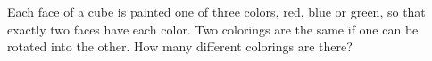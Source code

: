Each face of a cube is painted one of three colors, red, blue or green, so that exactly two faces have each color. Two colorings are the same if one can be rotated into the other. How many different colorings are there?
